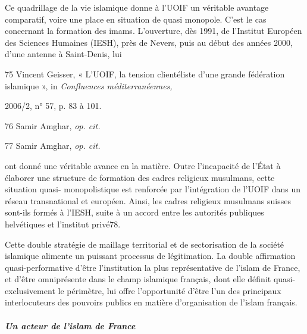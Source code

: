 Ce quadrillage de la vie islamique donne à l'UOIF un véritable avantage
comparatif, voire une place en situation de quasi monopole. C'est le cas
concernant la formation des imams. L'ouverture, dès 1991, de l'Institut
Européen des Sciences Humaines (IESH), près de Nevers, puis au début des
années 2000, d'une antenne à Saint-Denis, lui

75 Vincent Geisser, « L'UOIF, la tension clientéliste d'une grande
fédération islamique », in \emph{Confluences méditerranéennes,}

2006/2, n° 57, p. 83 à 101.

76 Samir Amghar, \emph{op. cit.}

77 Samir Amghar, \emph{op. cit.}



ont donné une véritable avance en la matière. Outre l'incapacité de
l'État à élaborer une structure de formation des cadres religieux
musulmans, cette situation quasi- monopolistique est renforcée par
l'intégration de l'UOIF dans un réseau transnational et européen. Ainsi,
les cadres religieux musulmans suisses sont-ils formés à l'IESH, suite à
un accord entre les autorités publiques helvétiques et l'institut
privé78.

Cette double stratégie de maillage territorial et de sectorisation de la
société islamique alimente un puissant processus de légitimation. La
double affirmation quasi-performative d'être l'institution la plus
représentative de l'islam de France, et d'être omniprésente dans le
champ islamique français, dont elle définit quasi-exclusivement le
périmètre, lui offre l'opportunité d'être l'un des principaux
interlocuteurs des pouvoirs publics en matière d'organisation de l'islam
français.


\hypertarget{un-acteur-de-lislam-de-france}{%
\subparagraph{Un acteur de l'islam de
France}\label{un-acteur-de-lislam-de-france}}


